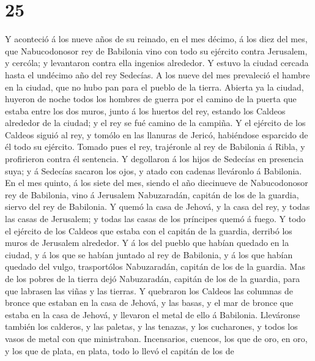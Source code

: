 \hypertarget{section-24}{%
\section{25}\label{section-24}}

 Y aconteció á los nueve años de su reinado, en el mes
décimo, á los diez del mes, que Nabucodonosor rey de Babilonia vino con
todo su ejército contra Jerusalem, y cercóla; y levantaron contra ella
ingenios alrededor.  Y estuvo la ciudad cercada hasta el
undécimo año del rey Sedecías.  A los nueve del mes
prevaleció el hambre en la ciudad, que no hubo pan para el pueblo de la
tierra.  Abierta ya la ciudad, huyeron de noche todos los
hombres de guerra por el camino de la puerta que estaba entre los dos
muros, junto á los huertos del rey, estando los Caldeos alrededor de la
ciudad; y el rey se fué camino de la campiña.  Y el
ejército de los Caldeos siguió al rey, y tomólo en las llanuras de
Jericó, habiéndose esparcido de él todo su ejército. 
Tomado pues el rey, trajéronle al rey de Babilonia á Ribla, y
profirieron contra él sentencia.  Y degollaron á los hijos
de Sedecías en presencia suya; y á Sedecías sacaron los ojos, y atado
con cadenas lleváronlo á Babilonia.  En el mes quinto, á
los siete del mes, siendo el año diecinueve de Nabucodonosor rey de
Babilonia, vino á Jerusalem Nabuzaradán, capitán de los de la guardia,
siervo del rey de Babilonia.  Y quemó la casa de Jehová, y
la casa del rey, y todas las casas de Jerusalem; y todas las casas de
los príncipes quemó á fuego.  Y todo el ejército de los
Caldeos que estaba con el capitán de la guardia, derribó los muros de
Jerusalem alrededor.  Y á los del pueblo que habían
quedado en la ciudad, y á los que se habían juntado al rey de Babilonia,
y á los que habían quedado del vulgo, trasportólos Nabuzaradán, capitán
de los de la guardia.  Mas de los pobres de la tierra
dejó Nabuzaradán, capitán de los de la guardia, para que labrasen las
viñas y las tierras.  Y quebraron los Caldeos las
columnas de bronce que estaban en la casa de Jehová, y las basas, y el
mar de bronce que estaba en la casa de Jehová, y llevaron el metal de
ello á Babilonia.  Lleváronse también los calderos, y las
paletas, y las tenazas, y los cucharones, y todos los vasos de metal con
que ministraban.  Incensarios, cuencos, los que de oro,
en oro, y los que de plata, en plata, todo lo llevó el capitán de los de
